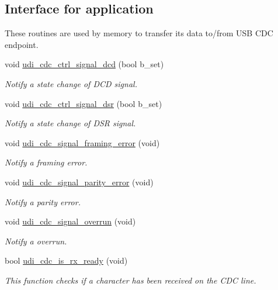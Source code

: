 \subsection*{\-Interface for application}
\label{_amgrp57a789adfa102d7a8d7505a6e50374a2}%
 \-These routines are used by memory to transfer its data to/from \-U\-S\-B \-C\-D\-C endpoint. \begin{DoxyCompactItemize}
\item 
void \hyperlink{group__udi__cdc__group_ga5507164c7c4ff2c9b94af48229dc0c3c}{udi\-\_\-cdc\-\_\-ctrl\-\_\-signal\-\_\-dcd} (bool b\-\_\-set)
\begin{DoxyCompactList}\small\item\em \-Notify a state change of \-D\-C\-D signal. \end{DoxyCompactList}\item 
void \hyperlink{group__udi__cdc__group_ga6b34b223f6c03cd35fc16d29cb9cfb78}{udi\-\_\-cdc\-\_\-ctrl\-\_\-signal\-\_\-dsr} (bool b\-\_\-set)
\begin{DoxyCompactList}\small\item\em \-Notify a state change of \-D\-S\-R signal. \end{DoxyCompactList}\item 
void \hyperlink{group__udi__cdc__group_gaf62c55c329d7e7ff3913274b124e54aa}{udi\-\_\-cdc\-\_\-signal\-\_\-framing\-\_\-error} (void)
\begin{DoxyCompactList}\small\item\em \-Notify a framing error. \end{DoxyCompactList}\item 
void \hyperlink{group__udi__cdc__group_gab6dd1be8afa57a1bece870338bdc5f74}{udi\-\_\-cdc\-\_\-signal\-\_\-parity\-\_\-error} (void)
\begin{DoxyCompactList}\small\item\em \-Notify a parity error. \end{DoxyCompactList}\item 
void \hyperlink{group__udi__cdc__group_ga7730a564c9cb117af611958500a4fa7f}{udi\-\_\-cdc\-\_\-signal\-\_\-overrun} (void)
\begin{DoxyCompactList}\small\item\em \-Notify a overrun. \end{DoxyCompactList}\item 
bool \hyperlink{group__udi__cdc__group_gab5beb4e918e089e0eacf20dba1df73ea}{udi\-\_\-cdc\-\_\-is\-\_\-rx\-\_\-ready} (void)
\begin{DoxyCompactList}\small\item\em \-This function checks if a character has been received on the \-C\-D\-C line. \end{DoxyCompactList}\item 

\end{DoxyCompactItemize}
